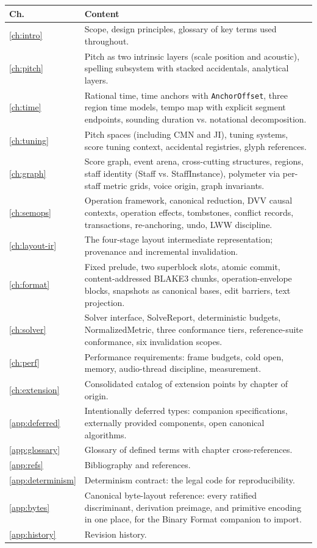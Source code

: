 \documentclass[11pt,letterpaper]{report}
\newcounter{requirement}[chapter]
\begin{document}
\begin{longtable}{p{1.6cm} p{12.4cm}}
  \toprule
  \textbf{Ch.} & \textbf{Content} \\
  \midrule
  \endhead
  \ref{ch:intro} & Scope, design principles, glossary of key
    terms used throughout. \\
  \ref{ch:pitch} & Pitch as two intrinsic layers (scale
    position and acoustic), spelling subsystem with stacked
    accidentals, analytical layers. \\
  \ref{ch:time} & Rational time, time anchors with
    \texttt{AnchorOffset}, three region time models, tempo map
    with explicit segment endpoints, sounding duration vs.
    notational decomposition. \\
  \ref{ch:tuning} & Pitch spaces (including CMN and JI), tuning
    systems, score tuning context, accidental registries, glyph
    references. \\
  \ref{ch:graph} & Score graph, event arena, cross-cutting
    structures, regions, staff identity (Staff vs.
    StaffInstance), polymeter via per-staff metric grids, voice
    origin, graph invariants. \\
  \ref{ch:semops} & Operation framework, canonical reduction,
    DVV causal contexts, operation effects, tombstones, conflict
    records, transactions, re-anchoring, undo, LWW discipline. \\
  \ref{ch:layout-ir} & The four-stage layout intermediate
    representation; provenance and incremental invalidation. \\
  \ref{ch:format} & Fixed prelude, two superblock slots, atomic
    commit, content-addressed BLAKE3 chunks,
    operation-envelope blocks, snapshots as canonical bases,
    edit barriers, text projection. \\
  \ref{ch:solver} & Solver interface, SolveReport, deterministic
    budgets, NormalizedMetric, three conformance tiers,
    reference-suite conformance, six invalidation scopes. \\
  \ref{ch:perf} & Performance requirements: frame budgets, cold
    open, memory, audio-thread discipline, measurement. \\
  \ref{ch:extension} & Consolidated catalog of extension points
    by chapter of origin. \\
  \ref{app:deferred} & Intentionally deferred types: companion
    specifications, externally provided components, open
    canonical algorithms. \\
  \ref{app:glossary} & Glossary of defined terms with
    chapter cross-references. \\
  \ref{app:refs} & Bibliography and references. \\
  \ref{app:determinism} & Determinism contract: the legal code
    for reproducibility. \\
  \ref{app:bytes} & Canonical byte-layout reference: every ratified
    discriminant, derivation preimage, and primitive encoding in one
    place, for the Binary Format companion to import. \\
  \ref{app:history} & Revision history. \\
  \bottomrule
\end{longtable}
\end{document}
